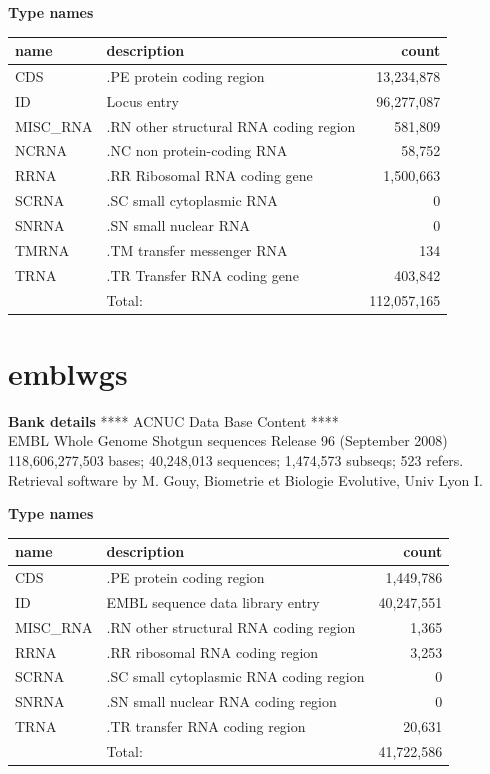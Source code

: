 \documentclass{article}
\begin{document}
\begin{Schunk}
\textbf{Type names}
\noindent\begin{tabular}{llr}
\hline \hline
name & description & count \\
\hline
CDS  &  .PE protein coding region  &  13,234,878 \\
ID  &  Locus entry  &  96,277,087 \\
MISC\_RNA  &  .RN other structural RNA coding region  &  581,809 \\
NCRNA  &  .NC non protein-coding RNA  &  58,752 \\
RRNA  &  .RR Ribosomal RNA coding gene  &  1,500,663 \\
SCRNA  &  .SC small cytoplasmic RNA  &  0 \\
SNRNA  &  .SN small nuclear RNA  &  0 \\
TMRNA  &  .TM transfer messenger RNA  &  134 \\
TRNA  &  .TR Transfer RNA coding gene  &  403,842 \\
\hline
 & Total: & 112,057,165 \\
\hline \hline
\end{tabular}

\section{ emblwgs }
\textbf{Bank details}
             ****     ACNUC Data Base Content      ****                         \\
        EMBL Whole Genome Shotgun sequences Release 96  (September 2008)  \\
118,606,277,503 bases; 40,248,013 sequences; 1,474,573 subseqs; 523 refers.\\
Retrieval software by M. Gouy, Biometrie et Biologie Evolutive, Univ Lyon I. 

\textbf{Type names}
\noindent\begin{tabular}{llr}
\hline \hline
name & description & count \\
\hline
CDS  &  .PE protein coding region  &  1,449,786 \\
ID  &  EMBL sequence data library entry  &  40,247,551 \\
MISC\_RNA  &  .RN other structural RNA coding region  &  1,365 \\
RRNA  &  .RR ribosomal RNA coding region  &  3,253 \\
SCRNA  &  .SC small cytoplasmic RNA coding region  &  0 \\
SNRNA  &  .SN small nuclear RNA coding region  &  0 \\
TRNA  &  .TR transfer RNA coding region  &  20,631 \\
\hline
 & Total: & 41,722,586 \\
\hline \hline
\end{tabular}


\end{Schunk}
\end{document}
